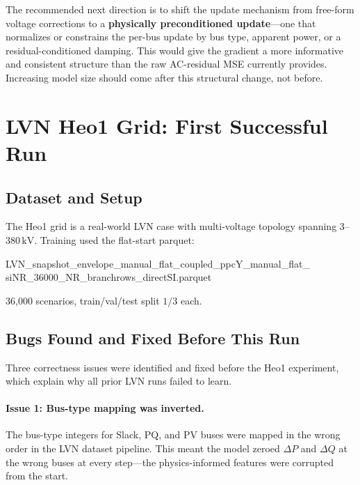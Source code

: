 \documentclass{article}
\begin{document}
The recommended next direction is to shift the update mechanism from
free-form voltage corrections to a \textbf{physically preconditioned
update}---one that normalizes or constrains the per-bus update by bus type,
apparent power, or a residual-conditioned damping.  This would give the
gradient a more informative and consistent structure than the raw
AC-residual MSE currently provides.  Increasing model size should come
after this structural change, not before.

\section{LVN Heo1 Grid: First Successful Run}

\subsection{Dataset and Setup}

The Heo1 grid is a real-world LVN case with multi-voltage topology spanning
$3$--$380\,\mathrm{kV}$.  Training used the flat-start parquet:

\begin{center}
\small\ttfamily\raggedright
LVN\_snapshot\_envelope\_manual\_flat\_coupled\_ppcY\_manual\_flat\_%
siNR\_36000\_NR\_branchrows\_directSI.parquet
\end{center}

36{,}000 scenarios, train/val/test split $1/3$ each.

\subsection{Bugs Found and Fixed Before This Run}

Three correctness issues were identified and fixed before the Heo1
experiment, which explain why all prior LVN runs failed to learn.

\paragraph{Issue 1: Bus-type mapping was inverted.}
The bus-type integers for Slack, PQ, and PV buses were mapped in the wrong
order in the LVN dataset pipeline.  This meant the model zeroed $\Delta P$
and $\Delta Q$ at the wrong buses at every step---the physics-informed
features were corrupted from the start.
\end{document}
